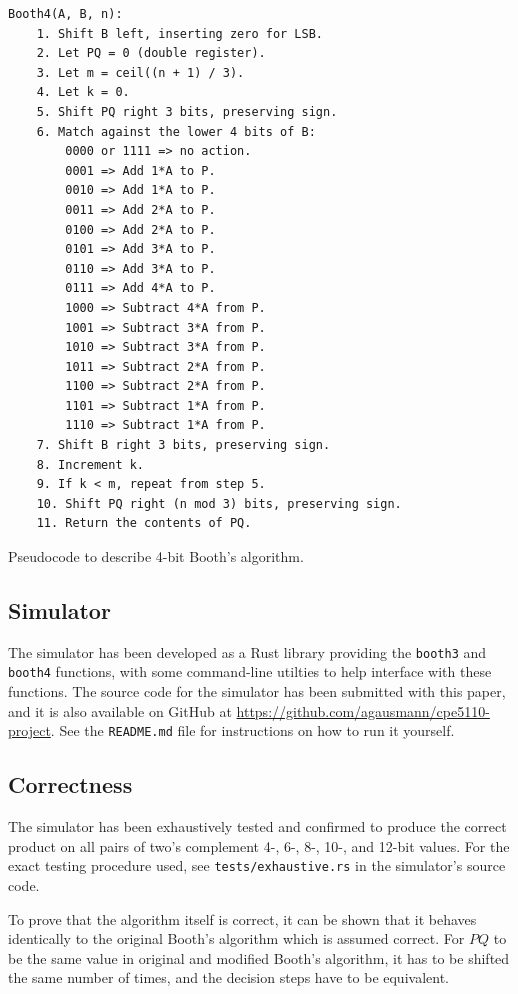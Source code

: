 \documentclass[12pt]{article}
\begin{document}
\begin{algorithm}[H]
	\begin{lstlisting}
Booth4(A, B, n):
    1. Shift B left, inserting zero for LSB.
    2. Let PQ = 0 (double register).
    3. Let m = ceil((n + 1) / 3).
    4. Let k = 0.
    5. Shift PQ right 3 bits, preserving sign.
    6. Match against the lower 4 bits of B:
        0000 or 1111 => no action.
        0001 => Add 1*A to P.
        0010 => Add 1*A to P.
        0011 => Add 2*A to P.
        0100 => Add 2*A to P.
        0101 => Add 3*A to P.
        0110 => Add 3*A to P.
        0111 => Add 4*A to P.
        1000 => Subtract 4*A from P.
        1001 => Subtract 3*A from P.
        1010 => Subtract 3*A from P.
        1011 => Subtract 2*A from P.
        1100 => Subtract 2*A from P.
        1101 => Subtract 1*A from P.
        1110 => Subtract 1*A from P.
    7. Shift B right 3 bits, preserving sign.
    8. Increment k.
    9. If k < m, repeat from step 5.
    10. Shift PQ right (n mod 3) bits, preserving sign.
    11. Return the contents of PQ.
	\end{lstlisting}
    \caption{Pseudocode to describe 4-bit Booth's algorithm.}
    \label{alg:booth4}
\end{algorithm}
\newpage

\subsection{Simulator}

The simulator has been developed as a Rust library providing the
\texttt{booth3} and \texttt{booth4} functions, with some command-line utilties
to help interface with these functions. The source code for the simulator has
been submitted with this paper, and it is also available on GitHub at
\url{https://github.com/agausmann/cpe5110-project}. See the \texttt{README.md}
file for instructions on how to run it yourself.

\subsection{Correctness}

The simulator has been exhaustively tested and confirmed to produce the correct
product on all pairs of two's complement 4-, 6-, 8-, 10-, and 12-bit values.
For the exact testing procedure used, see \texttt{tests/exhaustive.rs} in the
simulator's source code.

To prove that the algorithm itself is correct, it can be shown that it behaves
identically to the original Booth's algorithm which is assumed correct.  For
$PQ$ to be the same value in original and modified Booth's algorithm, it has to
be shifted the same number of times, and the decision steps have to be
equivalent.
\end{document}
